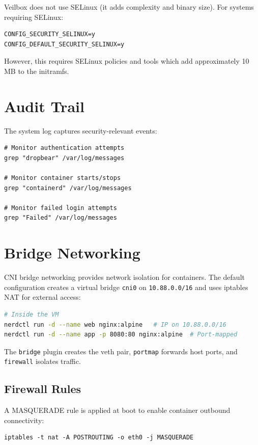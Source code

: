 Veilbox does not use SELinux (it adds complexity and binary size). For
systems requiring SELinux:

\begin{lstlisting}
CONFIG_SECURITY_SELINUX=y
CONFIG_DEFAULT_SECURITY_SELINUX=y
\end{lstlisting}

However, this requires SELinux policies and tools which add approximately
10 MB to the initramfs.

\section{Audit Trail}

The system log captures security-relevant events:

\begin{lstlisting}
# Monitor authentication attempts
grep "dropbear" /var/log/messages

# Monitor container starts/stops
grep "containerd" /var/log/messages

# Monitor failed login attempts
grep "Failed" /var/log/messages
\end{lstlisting}

\section{Bridge Networking}

CNI bridge networking provides network isolation for containers.
The default configuration creates a virtual bridge \texttt{cni0} on
\texttt{10.88.0.0/16} and uses iptables NAT for external access:

\begin{lstlisting}[language=bash]
# Inside the VM
nerdctl run -d --name web nginx:alpine   # IP on 10.88.0.0/16
nerdctl run -d --name app -p 8080:80 nginx:alpine  # Port-mapped
\end{lstlisting}

The \texttt{bridge} plugin creates the veth pair, \texttt{portmap}
forwards host ports, and \texttt{firewall} isolates traffic.

\subsection{Firewall Rules}

A MASQUERADE rule is applied at boot to enable container outbound
connectivity:

\begin{lstlisting}
iptables -t nat -A POSTROUTING -o eth0 -j MASQUERADE
\end{lstlisting}

